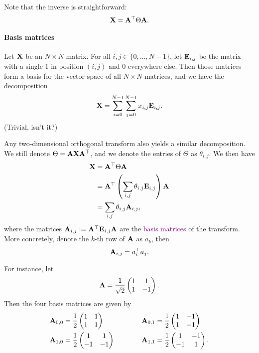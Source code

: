 \documentclass[a4paper, 11pt, openany]{book}
\numberwithin{equation}{section}
\theoremstyle{plain}
\theoremstyle{definition}
\newcommand{\Define}[1]{\textcolor{purple}{#1}}
\begin{document}
Note that the inverse is straightforward:
\[
    {\bf X} = {\bf A}^\top \Theta {\bf A}.
\]

\paragraph{Basis matrices}
Let ${\bf X}$ be an $N \times N$ matrix. For all $i,j \in \{0, \dots, N-1\}$, let ${\bf E}_{i,j}$ be the matrix with a single $1$ in position $(i,j)$ and $0$ everywhere else. Then those matrices form a basis for the vector space of all $N \times N$ matrices, and we have the decomposition
\[
    {\bf X} = \sum_{i=0}^{N-1} \sum_{j=0}^{N-1} x_{i,j} {\bf E}_{i,j}.
\]
(Trivial, isn't it?)

Any two-dimensional orthogonal transform also yields a similar decomposition. We still denote $\Theta = {\bf A} {\bf X} {\bf A}^\top$, and we denote the entries of $\Theta$ as $\theta_{i,j}$. We then have
\begin{align*}
    {\bf X} &= {\bf A}^\top \Theta {\bf A}\\
            &= {\bf A}^\top \left( \sum_{i,j} \theta_{i,j} {\bf E}_{i,j} \right) {\bf A}\\
            &= \sum_{i,j} \theta_{i,j} {\bf A}_{i,j},
\end{align*}
where the matrices ${\bf A}_{i,j} := {\bf A}^\top {\bf E}_{i,j} {\bf A}$ are the \Define{basis matrices} of the transform. More concretely, denote the $k$-th row of ${\bf A}$ as $a_k$, then
\[
    {\bf A}_{i,j} = a_i^\top a_j.
\]

For instance, let 
\[
    {\bf A} =  \frac{1}{ \sqrt{2} }
    \begin{pmatrix}
    1 & 1\\
    1 & -1
    \end{pmatrix}.
\]
Then the four basis matrices are given by
\begin{alignat*}{3}
    {\bf A}_{0,0} &= \frac{1}{2}
    \begin{pmatrix}
    1 & 1\\
    1 & 1
    \end{pmatrix} & 
    \qquad & &
    {\bf A}_{0,1} &= \frac{1}{2}
    \begin{pmatrix}
    1 & -1\\
    1 & -1
    \end{pmatrix} \\
    {\bf A}_{1,0} &= \frac{1}{2}
    \begin{pmatrix}
    1 & 1\\
    -1 & -1
    \end{pmatrix} & 
    \qquad & &
    {\bf A}_{1,1} &= \frac{1}{2}
    \begin{pmatrix}
    1 & -1\\
    -1 & 1
    \end{pmatrix}.
\end{alignat*}
\end{document}
